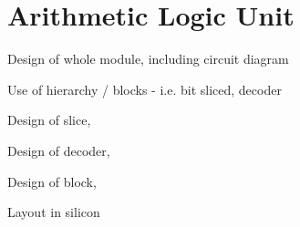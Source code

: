 

\section{Arithmetic Logic Unit}


Design of whole module, including circuit diagram

Use of hierarchy / blocks - i.e. bit sliced, decoder

Design of slice,

Design of decoder,

Design of block,

Layout in silicon
